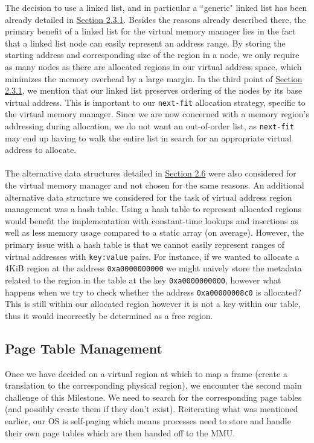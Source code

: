 The decision to use a linked list, and in particular a ``generic" linked list has been already detailed in \hyperref[m1-2]{Section 2.3.1}. Besides the reasons already described there, the primary benefit of a linked list for the virtual memory manager lies in the fact that a linked list node can easily represent an address range. By storing the starting address and corresponding size of the region in a node, we only require as many nodes as there are allocated regions in our virtual address space, which minimizes the memory overhead by a large margin. In the third point of \hyperref[m1-2]{Section 2.3.1}, we mention that our linked list preserves ordering of the nodes by its base virtual address. This is important to our \texttt{next-fit} allocation strategy, specific to the virtual memory manager. Since we are now concerned with a memory region's addressing during allocation, we do not want an out-of-order list, as \texttt{next-fit} may end up having to walk the entire list in search for an appropriate virtual address to allocate.
\\\\
The alternative data structures detailed in \hyperref[m1-6]{Section 2.6} were also considered for the virtual memory manager and not chosen for the same reasons.
An additional alternative data structure we considered for the task of virtual address region management was a hash table. Using a hash table to represent allocated regions would benefit the implementation with constant-time lookups and insertions as well as less memory usage compared to a static array (on average). However, the primary issue with a hash table is that we cannot easily represent ranges of virtual addresses with \texttt{key:value} pairs. For instance, if we wanted to allocate a 4KiB region at the address \texttt{0xa0000000000} we might naively store the metadata related to the region in the table at the key \texttt{0xa0000000000}, however what happens when we try to check whether the address \texttt{0xa00000008c0} is allocated? This is still within our allocated region however it is not a key within our table, thus it would incorrectly be determined as a free region.

\subsection{Page Table Management}
Once we have decided on a virtual region at which to map a frame (create a translation to the corresponding physical region), we encounter the second main challenge of this Milestone. We need to search for the corresponding page tables (and possibly create them if they don't exist). Reiterating what was mentioned earlier, our OS is self-paging which means processes need to store and handle their own page tables which are then handed off to the MMU.

